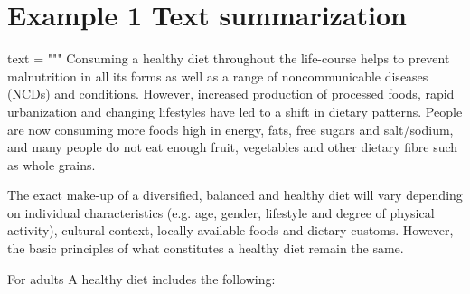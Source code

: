\documentclass[
  letterpaper,
  DIV=11,
  numbers=noendperiod]{scrreprt}
\newenvironment{Shaded}{\begin{snugshade}}{\end{snugshade}}
\newcommand{\NormalTok}[1]{\textcolor[rgb]{0.00,0.23,0.31}{#1}}
\newcommand{\OperatorTok}[1]{\textcolor[rgb]{0.37,0.37,0.37}{#1}}
\newcommand{\StringTok}[1]{\textcolor[rgb]{0.13,0.47,0.30}{#1}}
\begin{document}
\hypertarget{example-1-text-summarization}{%
\section{Example 1 Text
summarization}\label{example-1-text-summarization}}

\begin{Shaded}
\begin{Highlighting}[]
\NormalTok{text }\OperatorTok{=} \StringTok{"""}
\StringTok{Consuming a healthy diet throughout the life{-}course helps to prevent malnutrition in all its forms as well as a range of noncommunicable diseases (NCDs) and conditions. However, increased production of processed foods, rapid urbanization and changing lifestyles have led to a shift in dietary patterns. People are now consuming more foods high in energy, fats, free sugars and salt/sodium, and many people do not eat enough fruit, vegetables and other dietary fibre such as whole grains.}

\StringTok{The exact make{-}up of a diversified, balanced and healthy diet will vary depending on individual characteristics (e.g. age, gender, lifestyle and degree of physical activity), cultural context, locally available foods and dietary customs. However, the basic principles of what constitutes a healthy diet remain the same.}

\StringTok{For adults}
\StringTok{A healthy diet includes the following:}


\end{Highlighting}
\end{Shaded}
\end{document}
